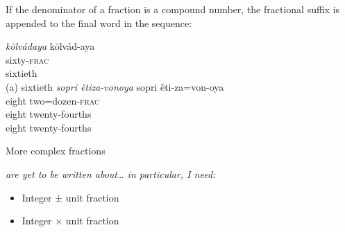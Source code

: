 \documentclass[grammar]{subfiles}
\begin{document}
	If the denominator of a fraction is a compound number, the fractional suffix is appended to the final word in the sequence:

	\begin{exe}
		\ex
		\begin{xlist}
			\ex \textit{kölvádaya}
			\glll kölvád-aya\\
			sixty\textsc{-frac}\\
			sixtieth\\
			\glt (a) sixtieth
			\ex \textit{sopri ětiza-vonoya}
			\glll sopri ěti-za=von-oya\\
			eight two=dozen\textsc{-frac}\\
			eight twenty-fourths\\
			\glt eight twenty-fourths
		\end{xlist}
	\end{exe}


	More complex fractions {\em are yet to be written about… in particular, I need:
		\begin{itemize}
			\item Integer ± unit fraction
			\item Integer × unit fraction
		\end{itemize}
	}


	
\end{document}
